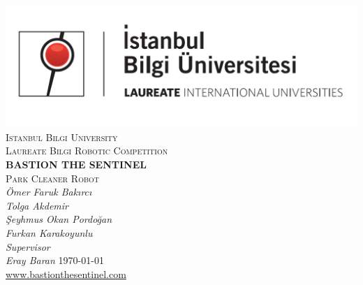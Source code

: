 \documentclass[12pt,a4paper]{article}
\begin{document}
\begin{titlepage}
 \centering
 \includegraphics[scale=0.3]{bilgi_logo}\\
 {\scshape\LARGE Istanbul Bilgi University\\}
 \vspace{1cm}
 {\scshape\Large Laureate Bilgi Robotic Competition\\}
 \vspace{2cm}
 {\huge\bfseries BASTION THE SENTINEL\\}
 {\scshape\Large Park Cleaner Robot\\}
 \vspace{2cm}
 {\Large\itshape Ömer Faruk Bakırcı\\}
 {\Large\itshape Tolga Akdemir\\}
 {\Large\itshape Şeyhmus Okan Pordoğan\\}
 {\Large\itshape Furkan Karakoyunlu\\}
 \vspace{4cm}
 {\Large\itshape Supervisor\\Eray Baran}
 \vfill
 \vfill
 {\large \today\\}
 \href{http://www.bastionthesentinel.com}{www.bastionthesentinel.com}
\end{titlepage}


\tableofcontents
\pagebreak
\end{document}
